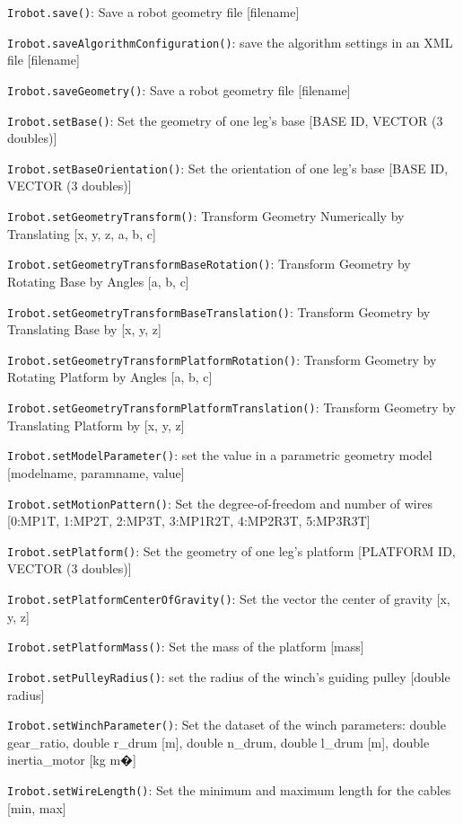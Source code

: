\documentclass[11pt,a4paper,onepage,openany]{book}
\begin{document}
\texttt{Irobot.save()}: Save a robot geometry file [filename]

\texttt{Irobot.saveAlgorithmConfiguration()}: save the algorithm settings in an XML file [filename]

\texttt{Irobot.saveGeometry()}: Save a robot geometry file [filename]

\texttt{Irobot.setBase()}: Set the geometry of one leg's base [BASE ID, VECTOR (3 doubles)]

\texttt{Irobot.setBaseOrientation()}: Set the orientation of one leg's base [BASE ID, VECTOR (3 doubles)]

\texttt{Irobot.setGeometryTransform()}: Transform Geometry Numerically by Translating [x, y, z, a, b, c]

\texttt{Irobot.setGeometryTransformBaseRotation()}: Transform Geometry by Rotating Base by Angles [a, b, c]

\texttt{Irobot.setGeometryTransformBaseTranslation()}: Transform Geometry by Translating Base by [x, y, z]

\texttt{Irobot.setGeometryTransformPlatformRotation()}: Transform Geometry by Rotating Platform by Angles [a, b, c]

\texttt{Irobot.setGeometryTransformPlatformTranslation()}: Transform Geometry by Translating Platform by [x, y, z]

\texttt{Irobot.setModelParameter()}: set the value in a parametric geometry model [modelname, paramname, value]

\texttt{Irobot.setMotionPattern()}: Set the degree-of-freedom and number of wires  [0:MP1T, 1:MP2T, 2:MP3T, 3:MP1R2T, 4:MP2R3T, 5:MP3R3T]

\texttt{Irobot.setPlatform()}: Set the geometry of one leg's platform [PLATFORM ID, VECTOR (3 doubles)]

\texttt{Irobot.setPlatformCenterOfGravity()}: Set the vector the center of gravity [x, y, z]

\texttt{Irobot.setPlatformMass()}: Set the mass of the platform [mass]

\texttt{Irobot.setPulleyRadius()}: set the radius of the winch's guiding pulley [double radius]

\texttt{Irobot.setWinchParameter()}: Set the dataset of the winch parameters: double gear\_ratio, double r\_drum [m], double n\_drum, double l\_drum [m], double inertia\_motor [kg m�]

\texttt{Irobot.setWireLength()}: Set the minimum and maximum length for the cables [min, max]
\end{document}
